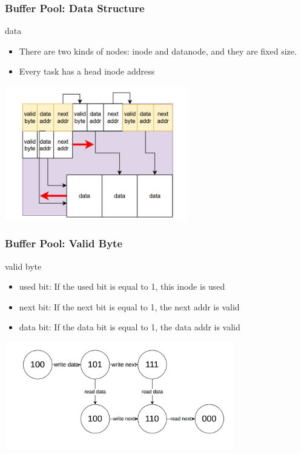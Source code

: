 \documentclass[notheorems, aspectratio=54]{beamer}
\begin{document}
\begin{frame}
    \frametitle{Buffer Pool: Data Structure}
    \begin{block} {data}
        \begin{itemize}
            \item There are two kinds of nodes: inode and datanode, and they are fixed size.
            \item Every task has a head inode address
        \end{itemize}
    \end{block}
    \centering
    \includegraphics[width=8cm]{global_img_dir/linklist.png}
\end{frame}

\begin{frame}
    \frametitle{Buffer Pool: Valid Byte}
    \begin{block} {valid byte}
        \begin{itemize}
            \item used bit: If the used bit is equal to 1, this inode is used
            \item next bit: If the next bit is equal to 1, the next addr is valid
            \item data bit: If the data bit is equal to 1, the data addr is valid
        \end{itemize}
    \end{block}
    \centering
    \includegraphics[width=10cm]{global_img_dir/automata.png}
\end{frame}
\end{document}
